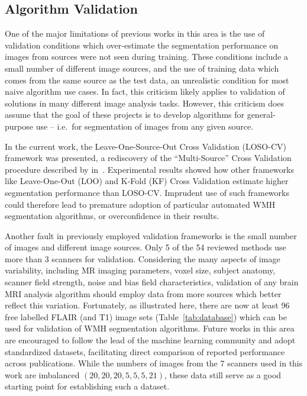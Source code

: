 \subsection{Algorithm Validation}
One of the major limitations of previous works in this area
is the use of validation conditions which over-estimate
the segmentation performance on images from sources
were not seen during training.
These conditions include a small number of different image sources,
and the use of training data which comes from the same source as the test data,
an unrealistic condition for most naive algorithm use cases.
In fact, this criticism likely applies to
validation of solutions in many different image analysis tasks.
However, this criticism does assume that the goal of these projects is to develop
algorithms for general-purpose use
-- i.e.\ for segmentation of images from any given source.
\par
In the current work, the Leave-One-Source-Out Cross Validation (LOSO-CV) framework was presented,
a rediscovery of the ``Multi-Source'' Cross Validation procedure
described by \citeauthor{Geras2013} in~\cite{Geras2013}.
Experimental results showed how other frameworks like
Leave-One-Out (LOO) and K-Fold (KF) Cross Validation
estimate higher segmentation performance than LOSO-CV.
Imprudent use of such frameworks could therefore lead to
premature adoption of particular automated WMH segmentation algorithms,
or overconfidence in their results.
\par
Another fault in previously employed validation frameworks is
the small number of images and different image sources.
Only 5 of the 54 reviewed methods use more than 3 scanners for validation.
Considering the many aspects of image variability, including
MR imaging parameters,
voxel size,
subject anatomy,
scanner field strength, noise and bias field characteristics,
validation of any brain MRI analysis algorithm
should employ data from more sources which better reflect this variation.
Fortunately, as illustrated here, there are now at least 96 free labelled FLAIR (and T1) image sets
(Table~\ref{tab:database})
which can be used for validation of WMH segmentation algorithms.
Future works in this area are encouraged to follow the lead of the machine learning community
and adopt standardized datasets, facilitating direct comparison of reported performance
across publications.
While the numbers of images from the 7 scanners used in this work are imbalanced
$(20,20,20,5,5,5,21)$,
these data still serve as a good starting point for establishing such a dataset.
